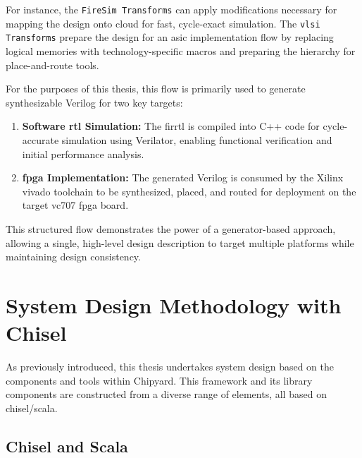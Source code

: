 For instance, the \texttt{FireSim Transforms} can apply modifications necessary for mapping the design onto cloud  for fast, cycle-exact simulation. The \texttt{\acrshort{vlsi} Transforms} prepare the design for an \acrshort{asic} implementation flow by replacing logical memories with technology-specific macros and preparing the hierarchy for place-and-route tools.

For the purposes of this thesis, this flow is primarily used to generate synthesizable Verilog for two key targets: 
\begin{enumerate}
    \item \textbf{Software \acrshort{rtl} Simulation:} The \acrshort{firrtl} is compiled into C++ code for cycle-accurate simulation using Verilator, enabling functional verification and initial performance analysis.
    \item \textbf{\acrshort{fpga} Implementation:} The generated Verilog is consumed by the Xilinx \acrshort{vivado} toolchain to be synthesized, placed, and routed for deployment on the target \acrshort{vc707} \acrshort{fpga} board.
\end{enumerate}

This structured flow demonstrates the power of a generator-based approach, allowing a single, high-level design description to target multiple platforms while maintaining design consistency.

\section{System Design Methodology with Chisel}
\label{sec:design_methodology_chisel}

As previously introduced, this thesis undertakes system design based on the components and tools within Chipyard. This framework and its library components are constructed from a diverse range of elements, all based on \acrshort{chisel}/\acrshort{scala}.

\subsection{Chisel and Scala}
\label{subsec:chisel_scala}

